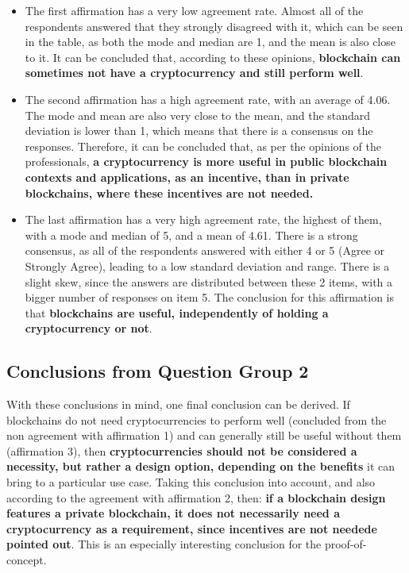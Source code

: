 \begin{itemize}
    \item The first affirmation has a very low agreement rate. Almost all of the respondents answered that they strongly disagreed with it, which can be seen in the table, as both the mode and median are 1, and the mean is also close to it. It can be concluded that, according to these opinions, \textbf{blockchain can sometimes not have a cryptocurrency and still perform well}.
    \item The second affirmation has a high agreement rate, with an average of 4.06. The mode and mean are also very close to the mean, and the standard deviation is lower than 1, which means that there is a consensus on the responses. Therefore, it can be concluded that, as per the opinions of the professionals, \textbf{a cryptocurrency is more useful in public blockchain contexts and applications, as an incentive, than in private blockchains, where these incentives are not needed.}
    \item The last affirmation has a very high agreement rate, the highest of them, with a mode and median of 5, and a mean of 4.61. There is a strong consensus, as all of the respondents answered with either 4 or 5 (Agree or Strongly Agree), leading to a low standard deviation and range. There is a slight skew, since the answers are distributed between these 2 items, with a bigger number of responses  on item 5. The conclusion for this affirmation is that \textbf{blockchains are useful, independently of holding a cryptocurrency or not}.
\end{itemize}


\subsection*{Conclusions from Question Group 2}

With these conclusions in mind, one final conclusion can be derived. If blockchains do not need cryptocurrencies to perform well (concluded from the non agreement with affirmation 1) and can generally still be useful without them (affirmation 3), then \textbf{cryptocurrencies should not be considered a necessity, but rather a design option, depending on the benefits} it can bring to a particular use case. Taking this conclusion into account, and also according to the agreement with affirmation 2, then: \textbf{if a blockchain design features a private blockchain, it does not necessarily need a cryptocurrency as a requirement, since incentives are not needede pointed out}. This is an especially interesting conclusion for the proof-of-concept.

